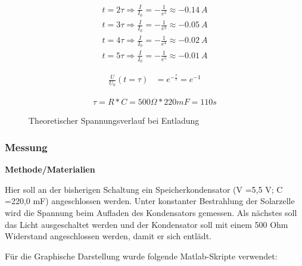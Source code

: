         \begin{align}
            t = 2\tau \Rightarrow \frac{I}{I_0} = - \frac{1}{e^2} \approx - 0.14\ A\\                   %
            t = 3\tau \Rightarrow \frac{I}{I_0} = - \frac{1}{e^3} \approx - 0.05\ A\\                   %
            t = 4\tau \Rightarrow \frac{I}{I_0} = - \frac{1}{e^4} \approx - 0.02\ A\\                   %
            t = 5\tau \Rightarrow \frac{I}{I_0} = - \frac{1}{e^5} \approx - 0.01\ A                   %
        \end{align}
        
        \begin{align}
            \frac{U}{U_0}(t=\tau) &= e^{-\frac{\tau}{\tau}} = e^{-1}                            %
        \end{align}

        
        \begin{align}
            \tau = R * C = 500 \Omega * 220mF = 110s                                                    %
        \end{align}
        
        \begin{figure}[H]
            \def\svgwidth{\textwidth}
            
            \caption{Theoretischer Spannungsverlauf bei Entladung}
        \end{figure}

        
    \subsubsection{Messung}                                             %
        \textbf{Methode/Materialien}
        \newline
        \par Hier soll an der bisherigen Schaltung ein Speicherkondensator (V =5,5 V; C =220,0 mF) angeschlossen
        werden. Unter konstanter Bestrahlung der Solarzelle wird die Spannung beim Aufladen des
        Kondensators gemessen. Als nächstes soll das Licht ausgeschaltet werden und der Kondensator soll mit
        einem 500 Ohm Widerstand angeschlossen werden, damit er sich entlädt.
        \par Für die Graphische Darstellung wurde folgende Matlab-Skripte verwendet:
        
